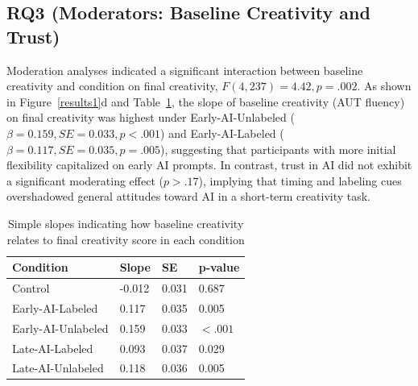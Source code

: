 \documentclass{article}
\begin{document}
\subsection{RQ3 (Moderators: Baseline Creativity and Trust)}  
Moderation analyses indicated a significant interaction between baseline creativity and condition on final creativity, \(F(4, 237) = 4.42, p = .002\). As shown in Figure~\ref{results1}d and Table~\ref{tab:regression_slopes}, the slope of baseline creativity (AUT fluency) on final creativity was highest under Early-AI-Unlabeled (\(\beta = 0.159, SE = 0.033, p < .001\)) and Early-AI-Labeled (\(\beta = 0.117, SE = 0.035, p = .005\)), suggesting that participants with more initial flexibility capitalized on early AI prompts. In contrast, trust in AI did not exhibit a significant moderating effect (\(p > .17\)), implying that timing and labeling cues overshadowed general attitudes toward AI in a short-term creativity task.
\begin{table}
    \centering
    \begin{tabular}{llll}
        \hline
        Condition & Slope & SE & p-value \\
        \hline
        Control & -0.012 & 0.031 & 0.687 \\
        Early-AI-Labeled & 0.117 & 0.035 & 0.005 \\
        Early-AI-Unlabeled & 0.159 & 0.033 & $<.001$ \\
        Late-AI-Labeled & 0.093 & 0.037 & 0.029 \\
        Late-AI-Unlabeled & 0.118 & 0.036 & 0.005 \\
        \hline
    \end{tabular}
    \caption{Simple slopes indicating how baseline creativity relates to final creativity score in each condition}
    \label{tab:regression_slopes}
\end{table}
\end{document}
